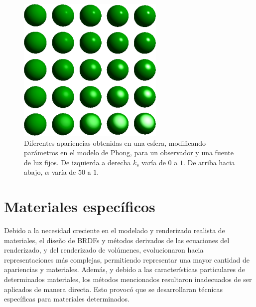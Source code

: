 \begin{figure}
\center
\includegraphics[width=7cm]{figures/phongparametros}
\caption[Diferentes apariencias en el modelo de Phong]{Diferentes apariencias obtenidas en una esfera, modificando parámetros en el modelo de Phong, para un observador y una fuente de luz fijos. De izquierda a derecha $k_{s}$ varía de $0$ a $1$. De arriba hacia abajo, $\alpha$ varía de $50$ a $1$.}
\label{fg:phongparametros}
\end{figure}



\section{Materiales específicos}
Debido a la necesidad creciente en el modelado y renderizado realista de materiales, el diseño de BRDFs y métodos derivados de las ecuaciones del renderizado, y del renderizado de volúmenes, evolucionaron hacia representaciones más complejas, permitiendo representar una mayor cantidad de apariencias y materiales.
Además, y debido a las características particulares de determinados materiales, los métodos mencionados resultaron inadecuados de ser aplicados de manera directa.
Esto provocó que se desarrollaran técnicas específicas para materiales determinados.

